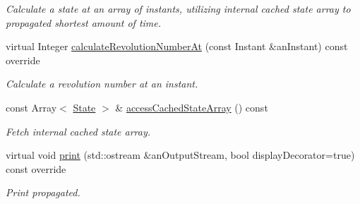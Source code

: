 \begin{DoxyCompactItemize}
\begin{DoxyCompactList}\small\item\em Calculate a state at an array of instants, utilizing internal cached state array to propagated shortest amount of time. \end{DoxyCompactList}\item 
virtual Integer \hyperlink{classostk_1_1astro_1_1trajectory_1_1orbit_1_1models_1_1_propagated_a6360392c65494aa42aadff58ec58e49c}{calculate\+Revolution\+Number\+At} (const Instant \&an\+Instant) const override
\begin{DoxyCompactList}\small\item\em Calculate a revolution number at an instant. \end{DoxyCompactList}\item 
const Array$<$ \hyperlink{classostk_1_1astro_1_1trajectory_1_1_state}{State} $>$ \& \hyperlink{classostk_1_1astro_1_1trajectory_1_1orbit_1_1models_1_1_propagated_ab13c196dcea01238b6e1997cb46ced2b}{access\+Cached\+State\+Array} () const
\begin{DoxyCompactList}\small\item\em Fetch internal cached state array. \end{DoxyCompactList}\item 
virtual void \hyperlink{classostk_1_1astro_1_1trajectory_1_1orbit_1_1models_1_1_propagated_a2b8aa6ff5511dbe92e6a3e7f4dd6880b}{print} (std\+::ostream \&an\+Output\+Stream, bool display\+Decorator=true) const override
\begin{DoxyCompactList}\small\item\em Print propagated. \end{DoxyCompactList}\end{DoxyCompactItemize}
